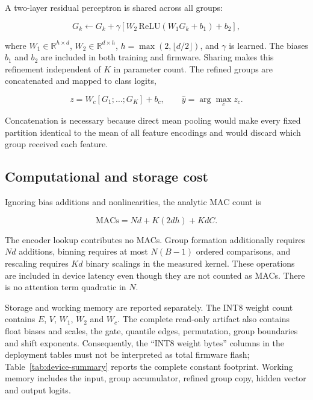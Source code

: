 \documentclass[10pt,letterpaper,twocolumn]{article}
\begin{document}
A two-layer residual perceptron is shared across all groups:

\begin{equation}
\label{eq:refine}
G_k\leftarrow G_k+\gamma\left[W_2\,\mathrm{ReLU}(W_1G_k+b_1)+b_2\right],
\end{equation}

where $W_1\in\mathbb{R}^{h\times d}$,
$W_2\in\mathbb{R}^{d\times h}$, $h=\max(2,\lfloor d/2\rfloor)$, and
$\gamma$ is learned. The biases $b_1$ and $b_2$ are included in both training
and firmware. Sharing makes this refinement independent of $K$ in parameter
count. The refined groups are concatenated and mapped to class logits,

\begin{equation}
\label{eq:head}
z=W_c[G_1;\ldots;G_K]+b_c,\qquad \hat y=\arg\max_c z_c.
\end{equation}

Concatenation is necessary because direct mean pooling would make every fixed
partition identical to the mean of all feature encodings and would discard
which group received each feature.

\subsection{Computational and storage cost}
\label{sec:method:cost}

Ignoring bias additions and nonlinearities, the analytic MAC count is

\begin{equation}
\label{eq:macs}
\mathrm{MACs}=Nd+K(2dh)+KdC.
\end{equation}

The encoder lookup contributes no MACs. Group formation additionally requires
$Nd$ additions, binning requires at most $N(B-1)$ ordered comparisons, and
rescaling requires $Kd$ binary scalings in the measured kernel. These
operations are included in device latency even though they are not counted as
MACs. There is no attention term quadratic in $N$.

Storage and working memory are reported separately. The INT8 weight count
contains $E$, $V$, $W_1$, $W_2$ and $W_c$. The complete read-only artifact also
contains float biases and scales, the gate, quantile edges, permutation, group
boundaries and shift exponents. Consequently, the ``INT8 weight bytes'' columns
in the deployment tables must not be interpreted as total firmware flash;
Table~\ref{tab:device-summary} reports the complete constant
footprint. Working memory includes the input, group accumulator, refined group
copy, hidden vector and output logits.
\end{document}
